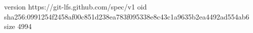 version https://git-lfs.github.com/spec/v1
oid sha256:0991254f2458af00c851d238ea783f095338e8c43c1a9635b2ea4492ad554ab6
size 4994
